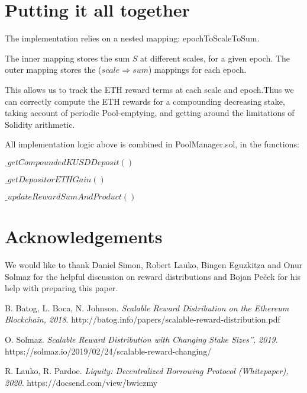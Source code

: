 \documentclass[reqno]{article}
\begin{document}
\bigskip
\section{Putting it all together}

\bigskip
The implementation relies on a nested mapping: epochToScaleToSum. 

\bigskip
The inner mapping stores the sum $S$ at different scales, for a given epoch. The outer mapping stores the ($scale \Rightarrow sum$) mappings for each epoch.

\bigskip
This allows us to track the ETH reward terms at each scale and epoch.Thus we can correctly compute the ETH rewards for a compounding decreasing stake, taking account of periodic Pool-emptying, and getting around the limitations of Solidity arithmetic.

\bigskip
All implementation logic above is combined in PoolManager.sol, in the functions:

\bigskip
$\_getCompoundedKUSDDeposit()$

$\_getDepositorETHGain()$

$\_updateRewardSumAndProduct()$

\section{Acknowledgements}
We would like to thank Daniel Simon, Robert Lauko, Bingen Eguzkitza and Onur Solmaz for the helpful discussion on reward distributions and Bojan Peček for his help with preparing this paper.

\begin{thebibliography}{9}
B. Batog, L. Boca, N. Johnson.
\textit{Scalable Reward Distribution on the Ethereum Blockchain, 2018}. 
http://batog.info/papers/scalable-reward-distribution.pdf

O. Solmaz. 
\textit{Scalable Reward Distribution with Changing Stake Sizes”, 2019}. 
https://solmaz.io/2019/02/24/scalable-reward-changing/

R. Lauko, R. Pardoe. 
\textit{Liquity: Decentralized Borrowing Protocol (Whitepaper), 2020}. 
https://docsend.com/view/bwiczmy


\end{thebibliography}
\end{document}
